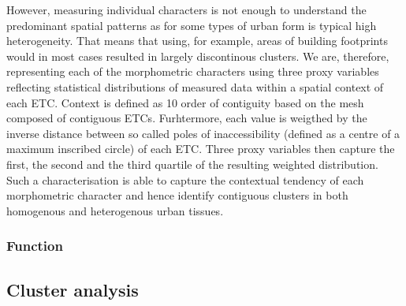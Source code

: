 However, measuring individual characters is not enough to understand the predominant
spatial patterns as for some types of urban form is typical high heterogeneity. That
means that using, for example, areas of building footprints would in most cases resulted
in largely discontinous clusters. We are, therefore, representing each of the
morphometric characters using three proxy variables reflecting statistical distributions
of measured data within a spatial context of each ETC. Context is defined as 10
order of contiguity based on the mesh composed of contiguous ETCs. Furhtermore, each
value is weigthed by the inverse distance between so called poles of inaccessibility
(defined as a centre of a maximum inscribed circle) of each ETC. Three proxy variables
then capture the first, the second and the third quartile of the resulting weighted
distribution. Such a characterisation is able to capture the contextual tendency of each
morphometric character and hence identify contiguous clusters in both homogenous and
heterogenous urban tissues.

\subsubsection*{Function}




\subsection*{Cluster analysis}



